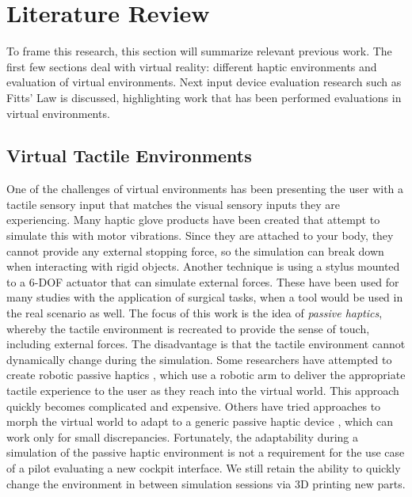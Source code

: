 \section{Literature Review}
\label{literature-review}

To frame this research, this section will summarize relevant previous work.
The first few sections deal with virtual reality: different haptic environments and evaluation of virtual environments.
Next input device evaluation research such as Fitts' Law is discussed, highlighting work that has been performed evaluations in virtual environments.

\subsection{Virtual Tactile Environments}
\label{virtual-tactile-environments}

One of the challenges of virtual environments has been presenting the user with a tactile sensory input that matches the visual sensory inputs they are experiencing.
Many haptic glove products have been created that attempt to simulate this with motor vibrations.
Since they are attached to your body, they cannot provide any external stopping force, so the simulation can break down when interacting with rigid objects.
Another technique is using a stylus mounted to a 6-DOF actuator that can simulate external forces.
These have been used for many studies with the application of surgical tasks, when a tool would be used in the real scenario as well.
The focus of this work is the idea of \emph{passive haptics}, whereby the tactile environment is recreated to provide the sense of touch, including external forces.
The disadvantage is that the tactile environment cannot dynamically change during the simulation.
Some researchers have attempted to create robotic passive haptics \citep{mcneely_robotic_1993, tachi_construction_1994}, which use a robotic arm to deliver the appropriate tactile experience to the user as they reach into the virtual world.
This approach quickly becomes complicated and expensive.
Others have tried approaches to morph the virtual world to adapt to a generic passive haptic device \citep{kohli_exploiting_2009,kohli_redirected_2012}, which can work only for small discrepancies.
Fortunately, the adaptability during a simulation of the passive haptic environment is not a requirement for the use case of a pilot evaluating a new cockpit interface.
We still retain the ability to quickly change the environment in between simulation sessions via 3D printing new parts.


